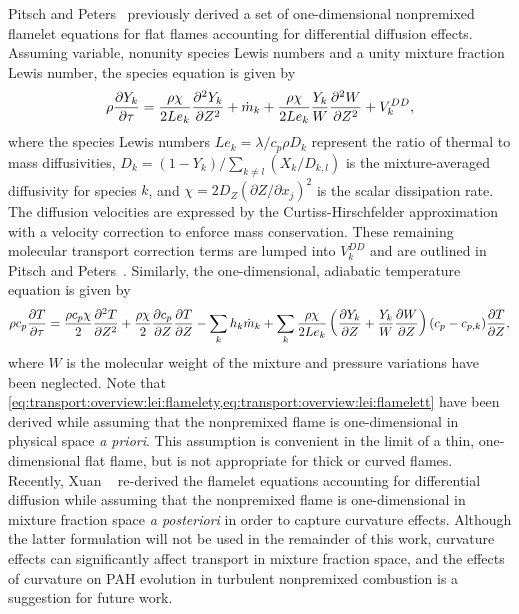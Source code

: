 Pitsch and Peters~\cite{pitsch1998} previously derived a set of one-dimensional nonpremixed flamelet equations for flat flames accounting for differential diffusion effects. Assuming variable, nonunity species Lewis numbers and a unity mixture fraction Lewis number, the species equation is given by
\begin{equation}\label{eq:transport:overview:lei:flamelety}
  \rho\pder[Y_k]{\tau} = \frac{\rho\chi}{2 Le_k}\sder[Y_k]{Z} + \dot{m}_k + \frac{\rho\chi}{2 Le_k}\frac{Y_k}{W}\sder[W]{Z} + V_k^{DD},
\end{equation}
where the species Lewis numbers $Le_k = \lambda/c_p\rho D_k$ represent the ratio of thermal to mass diffusivities, $D_k = (1 - Y_k)/\sum\limits_{k \neq l} (X_k/D_{k,l})$ is the mixture-averaged diffusivity for species $k$, and $\chi = 2D_Z(\partial Z/\partial x_j)^2$ is the scalar dissipation rate. The diffusion velocities are expressed by the Curtiss-Hirschfelder approximation~\cite{curtiss1949} with a velocity correction to enforce mass conservation. These remaining molecular transport correction terms are lumped into $V_k^{DD}$ and are outlined in Pitsch and Peters~\cite{pitsch1998}. Similarly, the one-dimensional, adiabatic temperature equation is given by
\begin{equation}\label{eq:transport:overview:lei:flamelett}
  \rho c_p \pder[T]{\tau} = \frac{\rho c_p \chi}{2}\sder[T]{Z} + \frac{\rho\chi}{2}\pder[c_p]{Z}\pder[T]{Z} - \sum\limits_{k} h_k\dot{m}_k + \sum\limits_{k} \frac{\rho\chi}{2 Le_k}\left( \pder[Y_k]{Z} + \frac{Y_k}{W}\pder[W]{Z} \right)(c_p - c_{p,k})\pder[T]{Z},
\end{equation}
where $W$ is the molecular weight of the mixture and pressure variations have been neglected. Note that \cref{eq:transport:overview:lei:flamelety,eq:transport:overview:lei:flamelett} have been derived while assuming that the nonpremixed flame is one-dimensional in physical space \textit{a priori}. This assumption is convenient in the limit of a thin, one-dimensional flat flame, but is not appropriate for thick or curved flames. Recently, Xuan \etal~\cite{xuan2014} re-derived the flamelet equations accounting for differential diffusion while assuming that the nonpremixed flame is one-dimensional in mixture fraction space \textit{a posteriori} in order to capture curvature effects. Although the latter formulation will not be used in the remainder of this work, curvature effects can significantly affect transport in mixture fraction space, and the effects of curvature on PAH evolution in turbulent nonpremixed combustion is a suggestion for future work.

